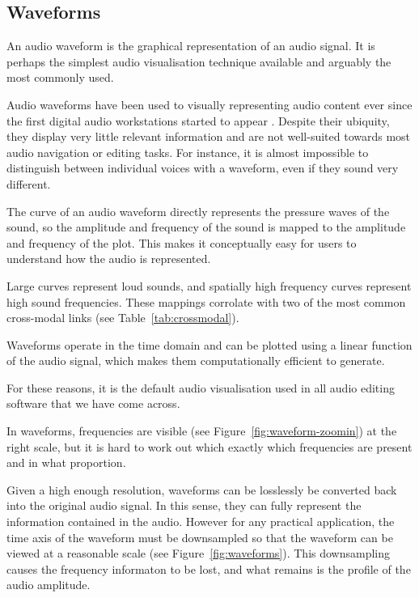 \subsection{Waveforms}

An audio waveform is the graphical representation of an audio signal. It is perhaps the simplest audio visualisation
technique available and arguably the most commonly used.

Audio waveforms have been used to visually representing audio content ever since the first digital audio workstations
started to appear \citep{Massie1985}. Despite their ubiquity, they display very little relevant information and are not
well-suited towards most audio navigation or editing tasks. For instance, it is almost impossible to distinguish
between individual voices with a waveform, even if they sound very different.


The curve of an audio waveform directly represents the pressure waves of the sound, so the amplitude and frequency of
the sound is mapped to the amplitude and frequency of the plot. This makes it conceptually easy for users to
understand how the audio is represented.

Large curves represent loud sounds, and spatially high frequency curves represent high sound frequencies. These
mappings corrolate with two of the most common cross-modal links (see Table~\ref{tab:crossmodal}).

Waveforms operate in the time domain and can be plotted using a linear function of the audio signal, which makes them
computationally efficient to generate. 

For these reasons, it is the default audio visualisation used in all audio editing software that we have come across.


In waveforms, frequencies are visible (see Figure~\ref{fig:waveform-zoomin}) at the right scale, but it is hard to work
out which exactly which frequencies are present and in what proportion.

Given a high enough resolution, waveforms can be losslessly be converted back into the original audio signal. In this
sense, they can fully represent the information contained in the audio. However for any practical application, the
time axis of the waveform must be downsampled so that the waveform can be viewed at a reasonable scale (see
Figure~\ref{fig:waveforms}).  This downsampling causes the frequency informaton to be lost, and what remains is the
profile of the audio amplitude.


